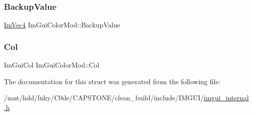 \subsubsection{\texorpdfstring{Backup\+Value}{BackupValue}}
{\footnotesize\ttfamily \hyperlink{structImVec4}{Im\+Vec4} Im\+Gui\+Color\+Mod\+::\+Backup\+Value}

\mbox{\label{structImGuiColorMod_a211171bd30d39348fc9b91289d253e1c}} 
\subsubsection{\texorpdfstring{Col}{Col}}
{\footnotesize\ttfamily Im\+Gui\+Col Im\+Gui\+Color\+Mod\+::\+Col}



The documentation for this struct was generated from the following file\+:\begin{DoxyCompactItemize}
\item 
/mnt/hdd/fnky/\+C0de/\+C\+A\+P\+S\+T\+O\+N\+E/clean\+\_\+build/include/\+I\+M\+G\+U\+I/\hyperlink{imgui__internal_8h}{imgui\+\_\+internal.\+h}\end{DoxyCompactItemize}
